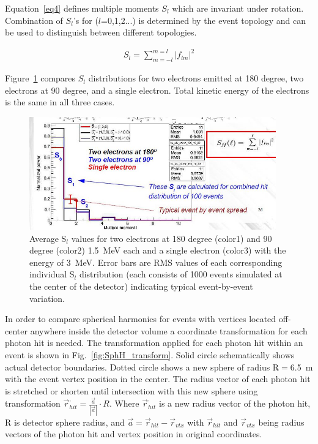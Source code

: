 \documentclass[12pt,twoside,letterpaper]{article}
\begin{document}
Equation~\ref{eq4} defines multiple moments $S_l$ which are invariant under rotation. Combination of $S_l$'s for ($l$=0,1,2...) is determined by the event topology and can be used to distinguish between different topologies.

\begin{eqnarray}
\label{eq4}
S_l = \sum_{m=-l}^{m=l} |f_{lm}|^2
\end{eqnarray}

Figure~\ref{fig:Moments} compares $S_l$ distributions for two electrons emitted at 180 degree, two electrons at 90 degree, and a single electron. Total kinetic energy of the electrons is the same in all three cases.


\begin{figure}[htb]
\centering
\includegraphics[angle=0,width=0.95\textwidth]{plots/Multiple_moment.JPG}
\caption{Average S$_l$ values for two electrons at 180 degree (color1) and 90 degree (color2) 1.5~MeV each and a single electron (color3) with the energy of 3~MeV. Error bars are RMS values of each corresponding individual S$_l$ distribution (each consists of 1000 events simulated at the center of the detector) indicating typical event-by-event variation.}
\label{fig:Moments}
\end{figure}


In order to compare spherical harmonics for events with vertices located off-center anywhere inside the detector volume a coordinate transformation for each photon hit is needed. The transformation applied for each photon hit within an event is shown in Fig.~\ref{fig:SphH_transform}. Solid circle schematically shows actual detector boundaries. Dotted circle shows a new sphere of radius R$=$6.5~m with the event vertex position in the center. The radius vector of each photon hit is stretched or shorten until intersection with this new sphere using transformation $\vec{r}^{,}_{hit} = \frac{\vec{a}}{|\vec{a}|} \cdot R$. Where $\vec{r}^{,}_{hit}$ is a new radius vector of the photon hit, R is detector sphere radius, and $\vec{a}=\vec{r}_{hit} - \vec{r}_{vtx}$ with $\vec{r}_{hit}$ and $\vec{r}_{vtx}$ being radius vectors of the photon hit and vertex position in original coordinates.
\end{document}
